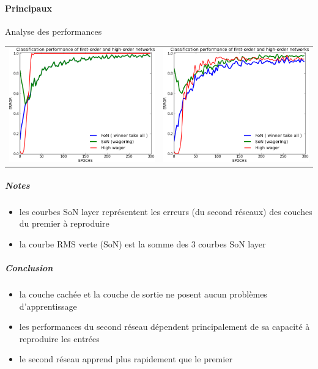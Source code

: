     \paragraph{Principaux}
      Analyse des performances
      \begin{center}
	\begin{tabular}{lr}
	  \hspace*{-1cm}
	  \includegraphics[width=250px]{data/expC2/perf_25.png}
	  &
	  \includegraphics[width=250px]{data/expC2/perf_100.png} 
	\end{tabular}
      \end{center}
      \subparagraph{Notes}
	\begin{itemize}
	  \item les courbes SoN layer représentent les erreurs (du second réseaux) des couches du premier à reproduire 
	  \item la courbe RMS verte (SoN) est la somme des 3 courbes SoN layer
	\end{itemize}
      \subparagraph{Conclusion}
	\begin{itemize}
	  \item la couche cachée et la couche de sortie ne posent aucun problèmes d'apprentissage
	  \item les performances du second réseau dépendent principalement de sa capacité à reproduire les entrées
	  \item le second réseau apprend plus rapidement que le premier
	\end{itemize}
